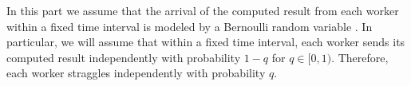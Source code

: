 \documentclass[journal,draftcls,onecolumn]{IEEEtran}
\theoremstyle{mystyle}
\newcommand{\aditya}[1]{\marginpar{+}{\bf Aditya's remark}: {\em #1}}
\newcommand{\sifat}[1]{\marginpar{+}{\bf Sifat's remark}: {\em #1}}
\begin{document}













In this part we assume that the arrival of the computed result from each worker within a fixed time interval is modeled by a Bernoulli random variable \cite{DBLP:journals/corr/abs-1901-09671}. In particular, we will assume that within a fixed time interval, each worker sends its computed result independently with probability $1-q$ for $q \in [0, 1)$. Therefore, each worker straggles independently with probability $q$.





\end{document}
